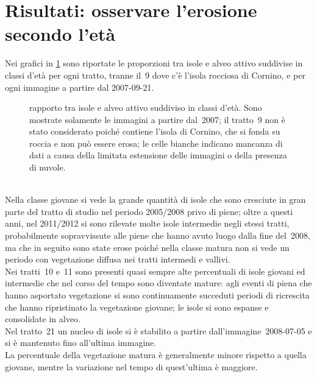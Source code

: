 \section{Risultati: osservare l'erosione secondo l'età}
Nei grafici in \cref{graph:rapp-isl-classi-eta-matrix} sono riportate le proporzioni tra isole e alveo attivo suddivise in classi d'età per ogni tratto, tranne il~9 dove c'è l'isola rocciosa di Cornino, e per ogni immagine a partire dal 2007-09-21.
%
\begin{figure}
	\centering
	
	\caption[rapporto tra isole e alveo attivo suddiviso in classi d'età]{rapporto tra isole e alveo attivo suddiviso in classi d'età.
	Sono mostrate solamente le immagini a partire dal~2007; il tratto~9 non è stato considerato poiché contiene l'isola di Cornino, che si fonda su roccia e non può essere erosa; le celle bianche indicano mancanza di dati a causa della limitata estensione delle immagini o della presenza di nuvole.}
	\label{graph:rapp-isl-classi-eta-matrix}
\end{figure}
%
\\
Nella classe giovane si vede la grande quantità di isole che sono cresciute in gran parte del tratto di studio nel periodo 2005/2008 privo di piene; oltre a questi anni, nel 2011/2012 si sono rilevate molte isole intermedie negli stessi tratti, probabilmente sopravvissute alle piene che hanno avuto luogo dalla fine del~2008, ma che in seguito sono state erose poiché nella classe matura non si vede un periodo con vegetazione diffusa nei tratti intermedi e vallivi.
\\
Nei tratti~10 e~11 sono presenti quasi sempre alte percentuali di isole giovani ed intermedie che nel corso del tempo sono diventate mature: agli eventi di piena che hanno asportato vegetazione si sono continuamente succeduti periodi di ricrescita che hanno ripristinato la vegetazione giovane; le isole si sono espanse e consolidate in alveo.
\\
Nel tratto~21 un nucleo di isole si è stabilito a partire dall'immagine~2008-07-05 e si è mantenuto fino all'ultima immagine.
\\
La percentuale della vegetazione matura è generalmente minore rispetto a quella giovane, mentre la variazione nel tempo di quest'ultima è maggiore.

